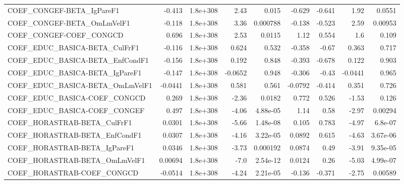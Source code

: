 \begin{tabular}{lrrrrrrrr}
COEF\_CONGEF-BETA\_IgPareF1             &      -0.413 &     1.8e+308 &     2.43 &    0.015 &     -0.629 &      -0.641 &         1.92 &        0.0551 \\
COEF\_CONGEF-BETA\_OmLmVelF1            &      -0.118 &     1.8e+308 &     3.36 & 0.000788 &     -0.138 &      -0.523 &         2.59 &       0.00953 \\
COEF\_CONGEF-COEF\_CONGCD               &       0.696 &     1.8e+308 &     2.53 &   0.0115 &       1.12 &       0.554 &          1.6 &         0.109 \\
COEF\_EDUC\_BASICA-BETA\_CulFrF1         &      -0.116 &     1.8e+308 &    0.624 &    0.532 &     -0.358 &       -0.67 &        0.363 &         0.717 \\
COEF\_EDUC\_BASICA-BETA\_EnfCondF1       &      -0.156 &     1.8e+308 &    0.192 &    0.848 &     -0.393 &      -0.678 &        0.122 &         0.903 \\
COEF\_EDUC\_BASICA-BETA\_IgPareF1        &      -0.147 &     1.8e+308 &  -0.0652 &    0.948 &     -0.306 &       -0.43 &      -0.0441 &         0.965 \\
COEF\_EDUC\_BASICA-BETA\_OmLmVelF1       &     -0.0441 &     1.8e+308 &    0.581 &    0.561 &    -0.0792 &      -0.414 &        0.351 &         0.726 \\
COEF\_EDUC\_BASICA-COEF\_CONGCD          &       0.269 &     1.8e+308 &    -2.36 &   0.0182 &      0.772 &       0.526 &        -1.53 &         0.126 \\
COEF\_EDUC\_BASICA-COEF\_CONGEF          &       0.497 &     1.8e+308 &    -4.06 & 4.88e-05 &       1.14 &        0.58 &        -2.97 &       0.00294 \\
COEF\_HORASTRAB-BETA\_CulFrF1           &      0.0301 &     1.8e+308 &    -5.66 & 1.48e-08 &      0.105 &       0.783 &        -4.97 &       6.8e-07 \\
COEF\_HORASTRAB-BETA\_EnfCondF1         &      0.0307 &     1.8e+308 &    -4.16 & 3.22e-05 &     0.0892 &       0.615 &        -4.63 &      3.67e-06 \\
COEF\_HORASTRAB-BETA\_IgPareF1          &      0.0346 &     1.8e+308 &    -3.73 & 0.000192 &     0.0874 &        0.49 &        -3.91 &      9.35e-05 \\
COEF\_HORASTRAB-BETA\_OmLmVelF1         &     0.00694 &     1.8e+308 &     -7.0 & 2.54e-12 &     0.0124 &        0.26 &        -5.03 &      4.99e-07 \\
COEF\_HORASTRAB-COEF\_CONGCD            &     -0.0514 &     1.8e+308 &    -4.24 & 2.21e-05 &     -0.136 &      -0.371 &        -2.75 &       0.00589 \\

\end{tabular}
